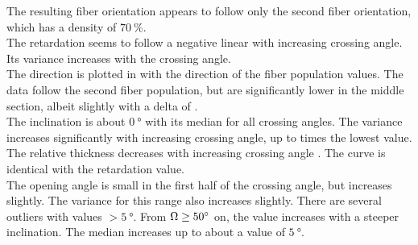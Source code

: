 The resulting fiber orientation appears to follow only the second fiber orientation, which has a density of $\SI{70}{\percent}$.
\\
The retardation seems to follow a negative linear \dummy{} with increasing crossing angle.
Its variance increases with the crossing angle.
\\
The direction is plotted in \dummy{} with the direction of the fiber population values.
The data follow the second fiber population, but are significantly lower in the middle section, albeit slightly with a delta of .
\\
The inclination is about $\SI{0}{\degree}$ with its median for all crossing angles.
The variance increases significantly with increasing crossing angle, up to  times the lowest value.
\\
The relative thickness \trel{} decreases with increasing crossing angle \modelOmega{}.
The curve is identical with the retardation value.
\\
The opening angle is small in the first half of the crossing angle, but increases slightly.
The variance for this range also increases slightly.
There are several outliers with values $> \SI{5}{\degree}$.
From $\textnormal{$\Omega$} \ge \SI{50}{\degree}$ on, the value increases with a steeper inclination.
The median increases up to about a value of $\SI{5}{\degree}$.
%
%
